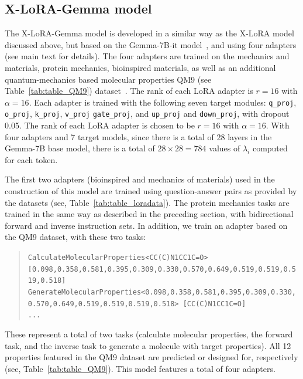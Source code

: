 \documentclass{article}
\begin{document}
\subsection{X-LoRA-Gemma model}
The X-LoRA-Gemma model is developed in a similar way as the X-LoRA model discussed above, but based on the Gemma-7B-it model~\cite{Google/gemma-7b-itFace}, and using four adapters (see main text for details). The four adapters are trained on the mechanics and materials, protein mechanics, bioinspired materials, as well as an additional quantum-mechanics based molecular properties QM9 (see Table~\ref{tab:table_QM9}) dataset~\cite{Ruddigkeit2012EnumerationGDB-17,Ramakrishnan2015ElectronicSpace}.
%    
The rank of each LoRA adapter is $r=16$ with $\alpha=16$. Each adapter is trained with the following seven target  modules: \texttt{q\_proj}, \texttt{o\_proj}, \texttt{k\_proj}, \texttt{v\_proj} \texttt{gate\_proj}, and \texttt{up\_proj} and \texttt{down\_proj}, with dropout 0.05. The rank of each LoRA adapter is  chosen to be $r=16$ with $\alpha=16$. With four adapters and 7 target models, since there is a total of 28 layers in the Gemma-7B base model, there is a total of $28\times 28=784$ values of $\lambda_i$ computed for each token.


The first two adapters (bioinspired and mechanics of materials) used in the construction of this model are trained using question-answer pairs as provided by the datasets (see, Table~\ref{tab:table_loradata}). 
%
The protein mechanics tasks are trained in the same way as described in the preceding section, with bidirectional forward and inverse instruction sets. In addition, we train an adapter based on the QM9 dataset, with these two tasks:  
\begin{quote}
\tiny {\texttt{CalculateMolecularProperties<CC(C)N1CC1C=O> [0.098,0.358,0.581,0.395,0.309,0.330,0.570,0.649,0.519,0.519,0.519,0.518]\\
GenerateMolecularProperties<0.098,0.358,0.581,0.395,0.309,0.330,0.570,0.649,0.519,0.519,0.519,0.518> [CC(C)N1CC1C=O]\\ 
...
}}
\end{quote}
These represent a total of two tasks (calculate molecular properties, the forward task, and the inverse task to generate a molecule with target properties). All 12 properties featured in the QM9 dataset are predicted or designed for, respectively (see, Table~\ref{tab:table_QM9}). 
This model features a total of four adapters. 
\end{document}
